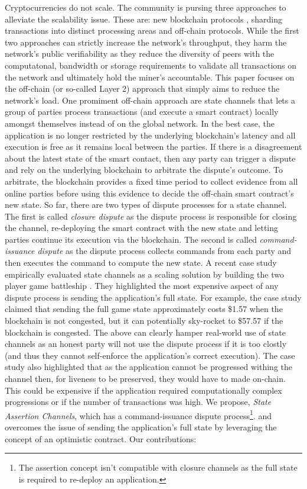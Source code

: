 \documentclass{llncs}
\begin{document}
Cryptocurrencies do not scale.
The community is pursing three approaches to alleviate the scalability issue. These are: new blockchain protocols \cite{bano2017consensus}, sharding transactions into distinct processing areas and off-chain protocols. 
While the first two approaches can strictly increase the network's throughput, they harm the network's public verifiability as they reduce the diversity of peers with the computatonal, bandwidth or storage requirements to validate all transactions on the network and ultimately hold the miner's accountable. 
This paper focuses on the off-chain (or so-called Layer 2) approach that simply aims to reduce the network's load.
One promiment off-chain approach are state channels that lets a group of parties process transactions (and execute a smart contract) locally amongst themselves instead of on the global network. 
In the best case, the application is no longer restricted by the underlying blockchain's latency and all execution is free as it remains local between the parties. 
If there is a disagreement about the latest state of the smart contact, then any party can trigger a dispute and rely on the underlying blockchain to arbitrate the dispute's outcome.
To arbitrate, the blockchain provides a fixed time period to collect evidence from all online parties before using this evidence to decide the off-chain smart contract's new state. 
So far, there are two types of dispute processes for a state channel. 
The first is called \emph{closure dispute} \cite{statechannelnetworks,battleship,celernetwork} as the dispute process is responsible for closing the channel, re-deploying the smart contract with the new state and letting parties continue its execution via the blockchain. 
The second is called \emph{command-issuance dispute} \cite{miller2017sprites,mccorry2018pisa,counterfactual,magmo} as the dispute process collects commands from each party and then executes the command to compute the new state. 
A recent case study empirically evaluated state channels as a scaling solution by building the  two player game battleship \cite{battleship}.
They highlighted the most expensive aspect of any dispute process is sending the application's full state. 
For example, the  case study claimed that sending the full game state approximately costs \$1.57 when the blockchain is not congested, but it can potentially sky-rocket to \$57.57 if the blockchain is congested. 
The above can clearly hamper real-world use of state channels as an honest party will not use the dispute process if it is too clostly (and thus they cannot self-enforce the application's correct execution). 
The case study also highlighted that as the application cannot be progressed withing the channel then, for liveness to be preserved, they would have to made on-chain. This could be expensive if the application required computationally complex progressions or if the number of transactions was high.
We propose, \emph{State Assertion Channels}, which has a command-issuance dispute process\footnote{The assertion concept isn't compatible with closure channels as the full state is required to re-deploy an application.}.  and overcomes the issue of sending the application's full state by leveraging the concept of an optimistic contract.
Our contributions: 
\end{document}
